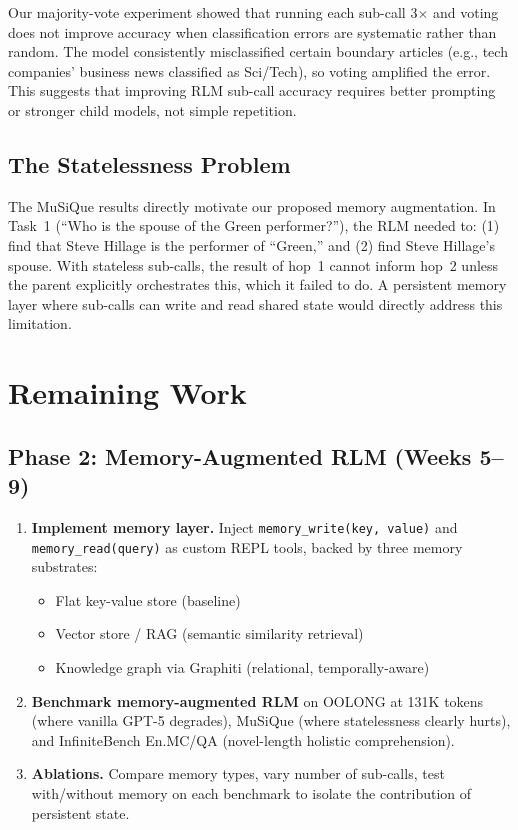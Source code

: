 \documentclass[11pt]{article}
\begin{document}
Our majority-vote experiment showed that running each sub-call 3$\times$ and voting does not improve accuracy when classification errors are systematic rather than random. The model consistently misclassified certain boundary articles (e.g., tech companies' business news classified as Sci/Tech), so voting amplified the error. This suggests that improving RLM sub-call accuracy requires better prompting or stronger child models, not simple repetition.

\subsection{The Statelessness Problem}

The MuSiQue results directly motivate our proposed memory augmentation. In Task~1 (``Who is the spouse of the Green performer?''), the RLM needed to: (1) find that Steve Hillage is the performer of ``Green,'' and (2) find Steve Hillage's spouse. With stateless sub-calls, the result of hop~1 cannot inform hop~2 unless the parent explicitly orchestrates this, which it failed to do. A persistent memory layer where sub-calls can write and read shared state would directly address this limitation.

\section{Remaining Work}

\subsection{Phase 2: Memory-Augmented RLM (Weeks 5--9)}

\begin{enumerate}
    \item \textbf{Implement memory layer.} Inject \texttt{memory\_write(key, value)} and \texttt{memory\_read(query)} as custom REPL tools, backed by three memory substrates:
    \begin{itemize}
        \item Flat key-value store (baseline)
        \item Vector store / RAG (semantic similarity retrieval)
        \item Knowledge graph via Graphiti \citep{ranade2025graphiti} (relational, temporally-aware)
    \end{itemize}

    \item \textbf{Benchmark memory-augmented RLM} on OOLONG at 131K tokens (where vanilla GPT-5 degrades), MuSiQue (where statelessness clearly hurts), and InfiniteBench En.MC/QA (novel-length holistic comprehension).

    \item \textbf{Ablations.} Compare memory types, vary number of sub-calls, test with/without memory on each benchmark to isolate the contribution of persistent state.
\end{enumerate}
\end{document}

